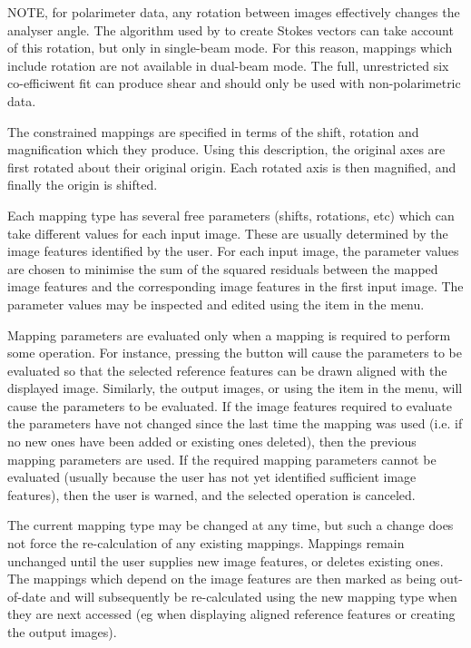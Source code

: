 NOTE, for polarimeter data, any rotation between images
effectively changes the analyser angle. The algorithm used by
 to create Stokes vectors can take account
of this rotation, but only in single-beam mode. For this reason, mappings
which include rotation are not available in dual-beam mode. The full,
unrestricted six co-efficiwent fit can produce shear and should only
be used with non-polarimetric data.

The constrained mappings are specified in terms of the shift, rotation and
magnification which they produce. Using this description, the original
axes are first rotated about their original origin. Each rotated axis is 
then magnified, and finally the origin is shifted.

Each mapping type has several free parameters (shifts, rotations, etc)
which can take different values for each input image. These are usually
determined by the image features identified by the user. For each input
image, the parameter values are chosen to minimise the sum of the squared
residuals between the mapped image features and the corresponding image
features in the first input image. The parameter values may be inspected
and edited using the  item
in the  menu.

Mapping parameters are evaluated only when a mapping is required to
perform some operation. For instance, pressing the  button will cause the parameters to be
evaluated so that the selected reference features can be drawn
aligned with the displayed image. Similarly,  
the output images, or using the 
item in the  menu, will cause the
parameters to be evaluated. If the image features required to evaluate
the parameters have not changed since the last time the mapping was used
(i.e. if no new ones have been added or existing ones deleted), then the
previous mapping parameters are used. If the required mapping parameters 
cannot be evaluated (usually because the user has not yet identified
sufficient image features), then the user is warned, and the selected
operation is canceled.

The current mapping type may be changed at any time, but such a change
does not force the re-calculation of any existing mappings. Mappings
remain unchanged until the user supplies new image features, or deletes
existing ones. The mappings which depend on the image features are then
marked as being out-of-date and will subsequently be re-calculated using
the new mapping type when they are next accessed (eg when displaying
aligned reference features or creating the output images).

